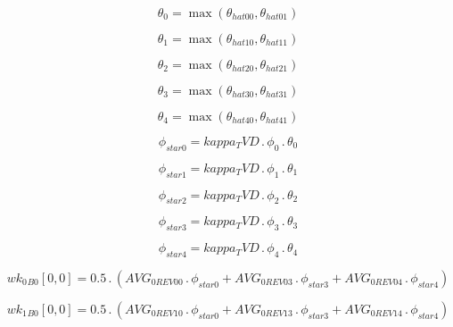 \documentclass{article}
\begin{document}
\begin{dmath}\theta_{0} = \max\left(\theta_{hat 00}, \theta_{hat 01}\right)\end{dmath}

\begin{dmath}\theta_{1} = \max\left(\theta_{hat 10}, \theta_{hat 11}\right)\end{dmath}

\begin{dmath}\theta_{2} = \max\left(\theta_{hat 20}, \theta_{hat 21}\right)\end{dmath}

\begin{dmath}\theta_{3} = \max\left(\theta_{hat 30}, \theta_{hat 31}\right)\end{dmath}

\begin{dmath}\theta_{4} = \max\left(\theta_{hat 40}, \theta_{hat 41}\right)\end{dmath}

\begin{dmath}\phi_{star 0} = kappa_TVD \,.\, \phi_{0} \,.\, \theta_{0}\end{dmath}

\begin{dmath}\phi_{star 1} = kappa_TVD \,.\, \phi_{1} \,.\, \theta_{1}\end{dmath}

\begin{dmath}\phi_{star 2} = kappa_TVD \,.\, \phi_{2} \,.\, \theta_{2}\end{dmath}

\begin{dmath}\phi_{star 3} = kappa_TVD \,.\, \phi_{3} \,.\, \theta_{3}\end{dmath}

\begin{dmath}\phi_{star 4} = kappa_TVD \,.\, \phi_{4} \,.\, \theta_{4}\end{dmath}

\begin{dmath}{wk_{0}{_{B0}}}[{0,0}] = 0.5 \,.\, \left(AVG_{0 REV 00} \,.\, \phi_{star 0} + AVG_{0 REV 03} \,.\, \phi_{star 3} + AVG_{0 REV 04} \,.\, \phi_{star 4}\right)\end{dmath}

\begin{dmath}{wk_{1}{_{B0}}}[{0,0}] = 0.5 \,.\, \left(AVG_{0 REV 10} \,.\, \phi_{star 0} + AVG_{0 REV 13} \,.\, \phi_{star 3} + AVG_{0 REV 14} \,.\, \phi_{star 4}\right)\end{dmath}
\end{document}
